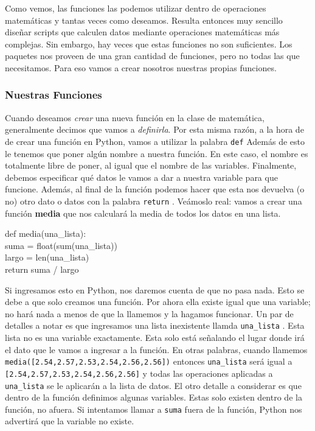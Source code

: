 \documentclass[10pt,letterpaper]{article}
\newcommand{\inlinecode}[1]{
\colorbox{light-gray}{\texttt{#1}}
}
\newenvironment{Code}
{
\begin{lrbox}{\selvestebox}%
\begin{minipage}{\dimexpr\columnwidth-2\fboxsep\relax}
\fontfamily{\ttdefault}\selectfont
}
{\end{minipage}\end{lrbox}%
\begin{center}
\colorbox{light-gray}{\usebox{\selvestebox}}
\end{center}
}
\begin{document}
Como vemos, las funciones las podemos utilizar dentro de operaciones matem\'aticas y tantas veces como deseamos. Resulta entonces muy sencillo dise\~nar scripts que calculen datos mediante operaciones matem\'aticas m\'as complejas. Sin embargo, hay veces que estas funciones no son suficientes. Los paquetes nos proveen de una gran cantidad de funciones, pero no todas las que necesitamos. Para eso vamos a crear nosotros nuestras propias funciones.

\subsubsection{Nuestras Funciones}
Cuando deseamos \emph{crear} una nueva funci\'on en la clase de matem\'atica, generalmente decimos que vamos a \emph{definirla}. Por esta misma raz\'on, a la hora de de crear una funci\'on en Python, vamos a utilizar la palabra \inlinecode{def} Adem\'as de esto le tenemos que poner alg\'un nombre a nuestra funci\'on. En este caso, el nombre es totalmente libre de poner, al igual que el nombre de las variables. Finalmente, debemos especificar qu\'e datos le vamos a dar a nuestra variable para que funcione. Adem\'as, al final de la funci\'on podemos hacer que esta nos devuelva (o no) otro dato o datos con la palabra \inlinecode{return}. Ve\'amoslo real: vamos a crear una funci\'on \textbf{media} que nos calcular\'a la media de todos los datos en una lista.

\begin{Code}
def media(una\_lista):\\
\hspace*{4mm} suma = float(sum(una\_lista))\\
\hspace*{4mm} largo = len(una\_lista)\\
\hspace*{4mm} return suma / largo
\end{Code}

Si ingresamos esto en Python, nos daremos cuenta de que no pasa nada. Esto se debe a que solo creamos una funci\'on. Por ahora ella existe igual que una variable; no har\'a nada a menos de que la llamemos y la hagamos funcionar. Un par de detalles a notar es que ingresamos una lista inexistente llamda \inlinecode{una\_lista}. Esta lista no es una variable exactamente. Esta solo est\'a se\~nalando el lugar donde ir\'a el dato que le vamos a ingresar a la funci\'on. En otras palabras, cuando llamemos \inlinecode{media([2.54,2.57,2.53,2.54,2.56,2.56])} entonces \inlinecode{una\_lista} ser\'a igual a \inlinecode{[2.54,2.57,2.53,2.54,2.56,2.56]} y todas las operaciones aplicadas a \inlinecode{una\_lista} se le aplicar\'an a la lista de datos. El otro detalle a considerar es que dentro de la funci\'on definimos algunas variables. Estas solo existen dentro de la funci\'on, no afuera. Si intentamos llamar a \inlinecode{suma} fuera de la funci\'on, Python nos advertir\'a que la variable no existe.\\
\end{document}
